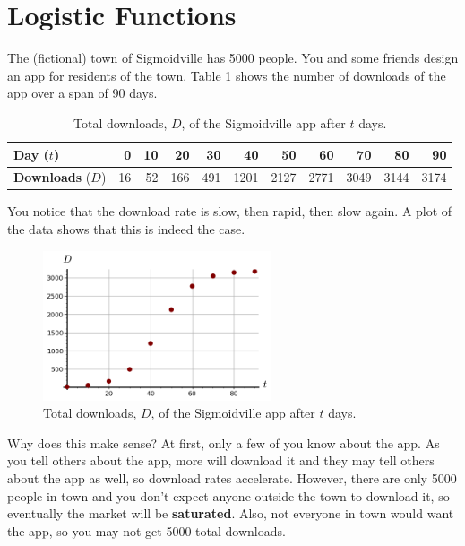 \section{Logistic Functions}
\label{sec:logistic}

The (fictional) town of Sigmoidville has 5000 people. You and some friends design an app for residents of the town. Table \ref{tab:1-7-app} shows the number of downloads of the app over a span of 90 days.

\begin{table}[!ht]

	\centering
  \begin{tabular}{lrrrrrrrrrr}
    \toprule
    {\bf Day} ($t$)       & 0 & 10 & 20  & 30 & 40 & 50 & 60 & 70 & 80 & 90 \\
    \midrule
    {\bf Downloads} ($D$) & 16 & 52 & 166 & 491 & 1201 & 2127 & 2771 & 3049 & 3144 & 3174   \\
    \bottomrule
\end{tabular}
\caption{Total downloads, $D$, of the Sigmoidville app after $t$ days.}
\label{tab:1-7-app}
\end{table}

You notice that the download rate is slow, then rapid, then slow again. A plot of the data shows that this is indeed the case.

\begin{figure}[!ht]
	\centering
	\includegraphics[width = 0.6\textwidth]{img/chap1/sec1-7/1-7-app.png}
	\caption{Total downloads, $D$, of the Sigmoidville app after $t$ days.}
    \label{fig:1-7-app}
	\end{figure}


Why does this make sense? At first, only a few of you know about the app. As you tell others about the app, more will download it and they may tell others about the app as well, so download rates accelerate. However, there are only 5000 people in town and you don't expect anyone outside the town to download it, so eventually the market will be {\bf saturated}. Also, not everyone in town would want the app, so you may not get 5000 total downloads.

